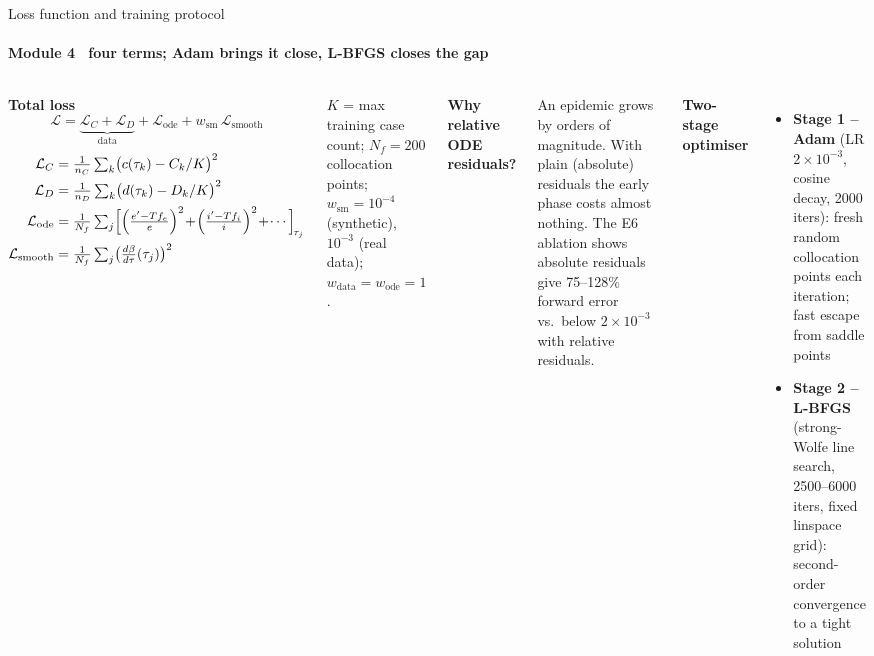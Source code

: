 \begin{frame}{Loss function and training protocol}
\framesubtitle{Module 4 \textbullet\ four terms; Adam brings it close, L-BFGS closes the gap}
\vspace{-2pt}
\begin{columns}[T,onlytextwidth]
  \footnotesize\raggedright
  \textbf{\color{mvPINN}Total loss}
  \[
    \mathcal{L} = \underbrace{\mathcal{L}_C + \mathcal{L}_D}_{\text{data}} + \mathcal{L}_{\text{ode}} + w_{\text{sm}}\,\mathcal{L}_{\text{smooth}}
  \]
  \vspace{-6pt}
  \begin{align*}
    \mathcal{L}_C &= \tfrac{1}{n_C}\textstyle\sum_k\bigl(c(\tau_k)-C_k/K\bigr)^2 \\
    \mathcal{L}_D &= \tfrac{1}{n_D}\textstyle\sum_k\bigl(d(\tau_k)-D_k/K\bigr)^2 \\
    \mathcal{L}_{\text{ode}} &= \tfrac{1}{N_f}\textstyle\sum_j\Bigl[
      \Bigl(\tfrac{e'-Tf_e}{e}\Bigr)^2\!+\!\Bigl(\tfrac{i'-Tf_i}{i}\Bigr)^2
      \!+\!\cdots\Bigr]_{\!\tau_j} \\
    \mathcal{L}_{\text{smooth}} &= \tfrac{1}{N_f}\textstyle\sum_j\bigl(\tfrac{d\beta}{d\tau}(\tau_j)\bigr)^2
  \end{align*}
  {\scriptsize $K$ = max training case count; $N_f=200$ collocation points; $w_{\text{sm}}=10^{-4}$ (synthetic), $10^{-3}$ (real data); $w_{\text{data}}=w_{\text{ode}}=1$.\par}
  \vspace{3pt}
  \textbf{\color{mvPINN}Why relative ODE residuals?}\\
  {\footnotesize An epidemic grows by orders of magnitude. With plain (absolute) residuals the early phase costs almost nothing. The E6 ablation shows absolute residuals give 75--128\% forward error vs.\ below $2\times10^{-3}$ with relative residuals.\par}
  \footnotesize\raggedright
  \textbf{\color{mvPINN}Two-stage optimiser}
  \begin{itemize}\setlength{\itemsep}{1pt}
    \item \textbf{Stage 1 -- Adam} (LR $2\times10^{-3}$, cosine decay, 2000 iters): fresh random collocation points each iteration; fast escape from saddle points
    \item \textbf{Stage 2 -- L-BFGS} (strong-Wolfe line search, 2500--6000 iters, fixed linspace grid): second-order convergence to a tight solution

\end{itemize}
\end{columns}
\end{frame}
